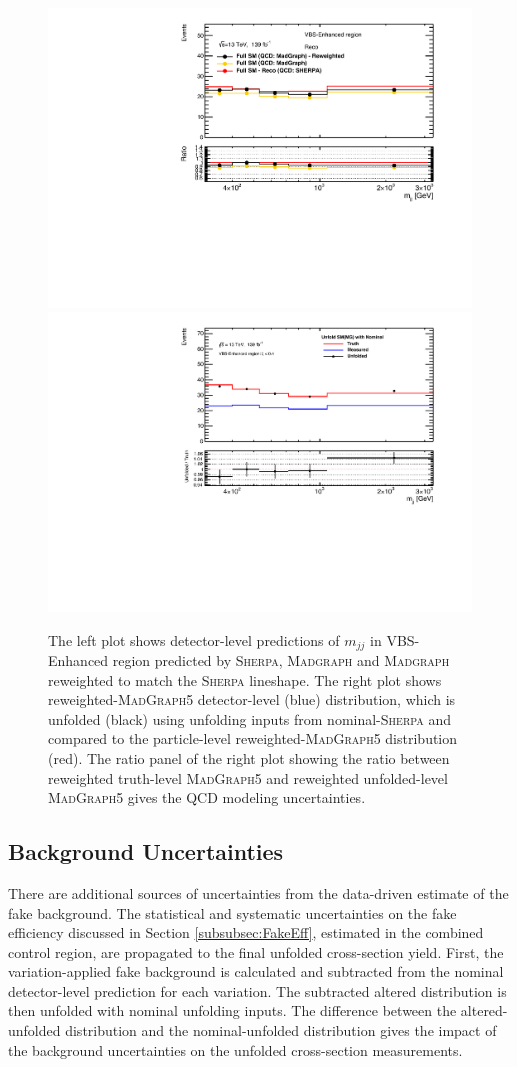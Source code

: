 \begin{itemize}
{    \begin{figure}[!htb]
        \centering
        \includegraphics[width=.48\linewidth]{figures/Analysis/Systematics/QCDmodel_Dist.pdf}
        \includegraphics[width=.48\linewidth]{figures/Analysis/Systematics/QCDmodel_Unc.pdf}
        \caption{The left plot shows detector-level predictions of $m_{jj}$ in VBS-Enhanced region predicted by \textsc{Sherpa}, \textsc{Madgraph} and \textsc{Madgraph} reweighted to match the \textsc{Sherpa} lineshape. The right plot shows reweighted-\textsc{MadGraph5} detector-level (blue) distribution, which is unfolded (black) using unfolding inputs from nominal-\textsc{Sherpa} and compared to the particle-level reweighted-\textsc{MadGraph5} distribution (red). The ratio panel of the right plot showing the ratio between reweighted truth-level \textsc{MadGraph5} and reweighted unfolded-level \textsc{MadGraph5} gives the QCD modeling uncertainties. \label{fig:QCDModelUnc}}
 \end{figure}  

    }
\end{itemize}

\subsection{Background Uncertainties}
\label{subsec:BkgUnc}
There are additional sources of uncertainties from the data-driven estimate of the fake background. The statistical and systematic uncertainties on the fake efficiency discussed in Section \ref{subsubsec:FakeEff}, estimated in the combined control region, are propagated to the final unfolded cross-section yield. First, the variation-applied fake background is calculated and subtracted from the nominal detector-level prediction for each variation. The subtracted altered distribution is then unfolded with nominal unfolding inputs. The difference between the altered-unfolded distribution and the nominal-unfolded distribution gives the impact of the background uncertainties on the unfolded cross-section measurements.


